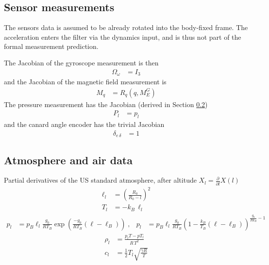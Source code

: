 \subsection{Sensor measurements}
The sensors data is assumed to be already rotated into the body-fixed frame.
The acceleration enters the filter via the dynamics input, and is thus not part of the formal measurement prediction.

The Jacobian of the gyroscope measurement is then 
\begin{align}
    \Omega_\omega &= I_3
\end{align}
and the Jacobian of the magnetic field measurement is 
\begin{align}
    M_q &= R_q(q,M_E^G)
\end{align}
The pressure measurement has the Jacobian (derived in Section \ref{sec:appendix-atmosphere})
\begin{align}
    P_l &= p_l
\end{align}
and the canard angle encoder has the trivial Jacobian 
\begin{align}
    \delta_{e \, \delta} &= 1
\end{align}

\subsection{Atmosphere and air data}
\label{sec:appendix-atmosphere}

Partial derivatives of the US standard atmosphere, after altitude $X_l = \frac{\partial}{\partial l} X(l)$
\begin{align}
    \ell_l &= \left(\frac{R_0}{R_0 - l}\right)^2 \\
    T_l &= -k_B \, \ell_l
\end{align}
\begin{align}
    p_l &= p_B \ell_l \frac{g_0}{R T_B} \exp \left( \frac{-g_0}{R T_B} (\ell-\ell_B) \right) \; , &
    p_l &= p_B \ell_l \frac{g_0}{R T_B} \left( 1 - \frac{k_B}{T_B} (\ell-\ell_B) \right) ^{\frac{g_0}{R k_B} -1}
\end{align}
\begin{align}
    \rho_l &= \frac{p_l T - p T_l}{R \, T^2} \\
    c_l &= \frac{1}{2} T_l \sqrt{\frac{\gamma R}{ T}}
\end{align}

